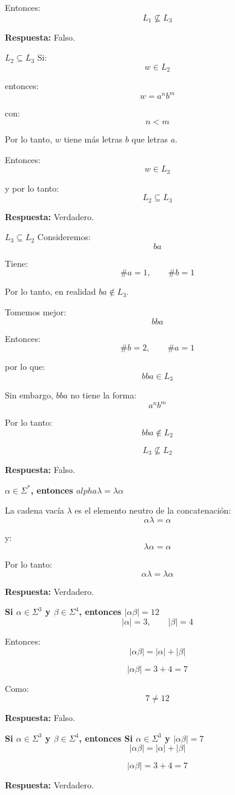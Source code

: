 \documentclass[12pt]{article}
\begin{document}
Entonces:
\[
L_1\nsubseteq L_3
\]

\textbf{Respuesta:} Falso.

\textbf{$L_2\subseteq L_3$}
Si:
\[
w\in L_2
\]

entonces:
\[
w=a^nb^m
\]

con:
\[
n<m
\]

Por lo tanto, $w$ tiene más letras $b$ que letras $a$.

Entonces:
\[
w\in L_3
\]

y por lo tanto:
\[
L_2\subseteq L_3
\]

\textbf{Respuesta:} Verdadero.

\textbf{$L_3\subseteq L_2$}
Consideremos:
\[
ba
\]

Tiene:
\[
\#a=1,\qquad\#b=1
\]

Por lo tanto, en realidad $ba\notin L_3$.

Tomemos mejor:
\[
bba
\]

Entonces:
\[
\#b=2,\qquad\#a=1
\]

por lo que:
\[
bba\in L_3
\]

Sin embargo, $bba$ no tiene la forma:
\[
a^nb^m
\]

Por lo tanto:
\[
bba\notin L_2
\]

\[
L_3\nsubseteq L_2
\]

\textbf{Respuesta:} Falso.

\textbf{$\alpha\in\Sigma^*$, entonces $alpha\lambda=\lambda\alpha$}

La cadena vacía $\lambda$ es el elemento neutro de la concatenación:
\[
\alpha\lambda=\alpha
\]

y:
\[
\lambda\alpha=\alpha
\]

Por lo tanto:
\[
\alpha\lambda=\lambda\alpha
\]

\textbf{Respuesta:} Verdadero.

\textbf{Si $\alpha\in\Sigma^3$ y $\beta\in\Sigma^4$, entonces $|\alpha\beta|=12$}
\[
|\alpha|=3,\qquad|\beta|=4
\]

Entonces:
\[
|\alpha\beta|=|\alpha|+|\beta|
\]

\[
|\alpha\beta|=3+4=7
\]

Como:
\[
7\neq12
\]

\textbf{Respuesta:} Falso.

\textbf{Si $\alpha\in\Sigma^3$ y $\beta\in\Sigma^4$, entonces Si $\alpha\in\Sigma^3$ y $|\alpha\beta|=7$}
\[
|\alpha\beta|=|\alpha|+|\beta|
\]

\[
|\alpha\beta|=3+4=7
\]

\textbf{Respuesta:} Verdadero.
\end{document}
